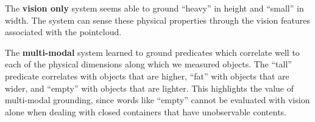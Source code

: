 The \textbf{vision only} system seems able to ground ``heavy'' in height and ``small'' in width.
The system can sense these physical properties through the vision features associated with the pointcloud.

The \textbf{multi-modal} system learned to ground predicates which correlate well to each of the physical dimensions along which we measured objects.
The ``tall'' predicate correlates with objects that are higher, ``fat'' with objects that are wider, and ``empty'' with objects that are lighter.
This highlights the value of multi-modal grounding, since words like ``empty'' cannot be evaluated with vision alone when dealing with closed containers that have unobservable contents.
